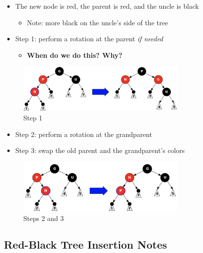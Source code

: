 \documentclass[
  10pt,
  english,
  letterpaper,
,tablecaptionabove
]{scrartcl}
\providecommand{\tightlist}{%
  \setlength{\itemsep}{0pt}\setlength{\parskip}{0pt}}
\begin{document}
\begin{itemize}
\tightlist
\item
  The new node is red, the parent is red, and the uncle is black

  \begin{itemize}
  \tightlist
  \item
    Note: more black on the uncle's side of the tree
  \end{itemize}
\item
  Step 1: perform a rotation at the parent \emph{if needed}

  \begin{itemize}
  \tightlist
  \item
    \textbf{When do we do this? Why?}
  \end{itemize}
\end{itemize}

\begin{figure}
\centering
\includegraphics[width=0.75\textwidth,height=\textheight]{images/7.png}
\caption{Step 1}
\end{figure}

\begin{itemize}
\tightlist
\item
  Step 2: perform a rotation at the grandparent
\item
  Step 3: swap the old parent and the grandparent's colors
\end{itemize}

\begin{figure}
\centering
\includegraphics[width=0.75\textwidth,height=\textheight]{images/8.png}
\caption{Steps 2 and 3}
\end{figure}

\hypertarget{red-black-tree-insertion-notes}{%
\subsection{Red-Black Tree Insertion
Notes}\label{red-black-tree-insertion-notes}}
\end{document}
